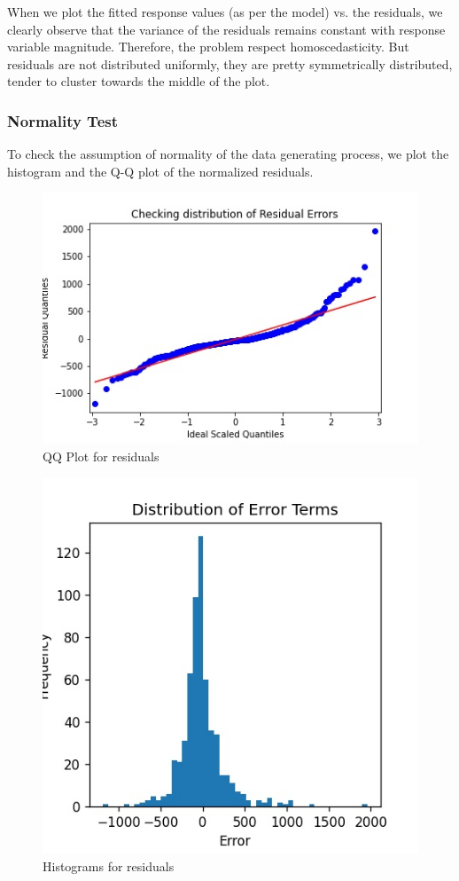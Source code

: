 \documentclass[12pt]{article}
\begin{document}
 When we plot the fitted response values (as per the model) vs. the residuals, we clearly observe that the variance of the residuals remains constant with response variable magnitude. Therefore, the problem respect homoscedasticity. But residuals are not distributed uniformly, they are pretty symmetrically distributed, tender to cluster towards the middle of the plot.\\
\subsubsection{Normality Test}
To check the assumption of normality of the data generating process, we  plot the histogram and the Q-Q plot of the normalized residuals.\\
\pagebreak
\begin{figure}[h]
\centering
\includegraphics[scale=.80]{images/death/death-residual-qqplot.jpg}
\caption{QQ Plot for residuals}
\end{figure}

\begin{figure}[h]
\centering
\includegraphics[scale=.7]{images/death/death-residual-histogram.jpg}
\caption{Histograms for residuals}
\end{figure}
\end{document}
